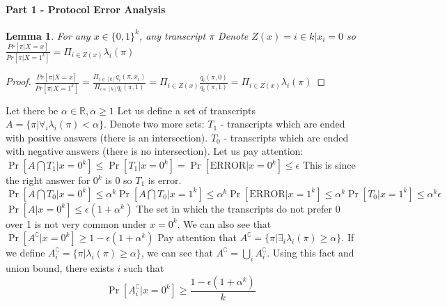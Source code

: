 \documentclass{article}
\theoremstyle{plain}
\newtheorem{lemma}[theorem]{Lemma}
\begin{document}
\paragraph{Part 1 - Protocol Error Analysis}
\begin{lemma}
For any $x \in \{0,1\}^k$, any transcript $\pi$ \newline
Denote $Z(x) = {i \in k | x_i = 0}$ so \newline
$\frac{Pr[\pi | X = x]}{Pr[\pi | X = 1^k]} = \Pi_{i \in Z(x)} \lambda_i (\pi)$
\end{lemma}
\begin{proof}
$\frac{Pr[\pi | X = x]}{Pr[\pi | X = 1^k]} = \frac{\Pi_{i \in [k]} q_i (\pi, x_i)}{\Pi_{i \in [k]} q_i (\pi, 1)} = \Pi_{i \in Z(x)} \frac{q_i (\pi, 0)}{q_i (\pi, 1)} = \Pi_{i \in Z(x)} \lambda_i (\pi)$
\end{proof}
Let there be $\alpha \in \mathbb{R}, \alpha \geq 1$ \newline
Let us define a set of transcripts $A = \{\pi | \forall_i \lambda_i (\pi) < \alpha \}$. 
Denote two more sets: $T_1$ - transcripts which are ended with positive answers (there is an intersection). $T_0$ - transcripts which are ended with negative answers (there is no intersection). \newline
Let us pay attention: \newline
$\Pr[A \bigcap T_1 | x = 0^k] \leq \Pr[T_1 | x = 0^k] = \Pr[\text{ERROR} | x = 0^k] \leq \epsilon$ \newline
This is since the right answer for $0^k$ is 0 so $T_1$ is error. \newline 
$\Pr[A \bigcap T_0 | x = 0^k] \leq \alpha ^k \Pr[A \bigcap T_0 | x = 1^k] \leq \alpha ^k \Pr[\text{ERROR} | x = 1^k] \leq \alpha ^k \Pr[T_0| x = 1^k] \leq \alpha ^k \epsilon$ \newline
$\Pr[A| x = 0^k] \leq \epsilon (1 + \alpha ^k) $ \newline
The set in which the transcripts do not prefer 0 over 1 is not very common under $x = 0^k$. \newline
We can also see that $\Pr[A^\complement| x = 0^k] \geq 1 - \epsilon (1 + \alpha ^k) $ \newline
Pay attention that $A^\complement = \{\pi | \exists_i \lambda_i(\pi) \geq \alpha\}$. \newline
If we define $A_{i}^\complement = \{\pi | \lambda_i(\pi) \geq \alpha\}$, we can see that $A^\complement = \bigcup_{i} A_{i}^\complement$.
Using this fact and union bound, there exists $i$ such that 
\begin{equation*}
    \Pr[A_{i}^\complement| x = 0^k] \geq \frac{1 - \epsilon (1 + \alpha ^k)}{k}
\end{equation*}
\end{document}
